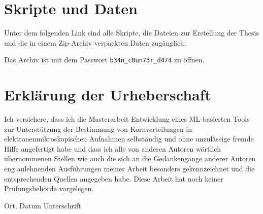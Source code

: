 \chapter*{Skripte und Daten}

Unter dem folgenden Link sind alle Skripte, die Dateien zur Erstellung der Thesis und die in einem Zip-Archiv verpackten Daten zugänglich:



Das Archiv ist mit dem Passwort \texttt{b34n\_c0un73r\_d474} zu öffnen.



\chapter*{Erklärung der Urheberschaft}

Ich versichere, dass ich die Masterarbeit \glqq{}Entwicklung eines ML-basierten Tools zur Unterstützung der Bestimmung von Kornverteilungen in elektronenmikroskopischen Aufnahmen\grqq{} selbständig und ohne
unzulässige fremde Hilfe angefertigt habe und dass ich alle von anderen Autoren wörtlich
übernommenen Stellen wie auch die sich an die Gedankengänge anderer Autoren eng
anlehnenden Ausführungen meiner Arbeit besonders gekennzeichnet und die
entsprechenden Quellen angegeben habe.
Diese Arbeit hat noch keiner Prüfungsbehörde vorgelegen.

\vspace{4cm}

\hspace{2cm} $\overline{\text{Ort, Datum}}$ \hfill $\overline{\text{Unterschrift} \hspace{2cm}}$
